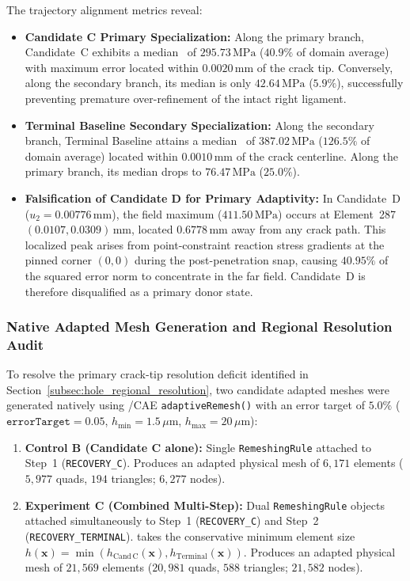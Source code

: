 The trajectory alignment metrics reveal:
\begin{itemize}
  \item \textbf{Candidate C Primary Specialization:} Along the primary branch, Candidate~C exhibits a median \MISESERI\ of $295.73\,\mathrm{MPa}$ ($40.9\%$ of domain average) with maximum error located within $0.0020\,\mathrm{mm}$ of the crack tip. Conversely, along the secondary branch, its median is only $42.64\,\mathrm{MPa}$ ($5.9\%$), successfully preventing premature over-refinement of the intact right ligament.
  \item \textbf{Terminal Baseline Secondary Specialization:} Along the secondary branch, Terminal Baseline attains a median \MISESERI\ of $387.02\,\mathrm{MPa}$ ($126.5\%$ of domain average) located within $0.0010\,\mathrm{mm}$ of the crack centerline. Along the primary branch, its median drops to $76.47\,\mathrm{MPa}$ ($25.0\%$).
  \item \textbf{Falsification of Candidate D for Primary Adaptivity:} In Candidate~D ($u_2 = 0.00776\,\mathrm{mm}$), the field maximum ($411.50\,\mathrm{MPa}$) occurs at Element~287 $(0.0107, 0.0309)\,\mathrm{mm}$, located $0.6778\,\mathrm{mm}$ away from any crack path. This localized peak arises from point-constraint reaction stress gradients at the pinned corner $(0, 0)$ during the post-penetration snap, causing $40.95\%$ of the squared error norm to concentrate in the far field. Candidate~D is therefore disqualified as a primary donor state.
\end{itemize}

\subsubsection{Native Adapted Mesh Generation and Regional Resolution Audit}
To resolve the primary crack-tip resolution deficit identified in Section~\ref{subsec:hole_regional_resolution}, two candidate adapted meshes were generated natively using \Abaqus/CAE \texttt{adaptiveRemesh()} with an error target of $5.0\%$ ($\mathtt{errorTarget = 0.05}$, $h_{\min} = 1.5\,\mu\mathrm{m}$, $h_{\max} = 20\,\mu\mathrm{m}$):
\begin{enumerate}
  \item \textbf{Control B (Candidate C alone):} Single \texttt{RemeshingRule} attached to Step~1 (\texttt{RECOVERY\_C}). Produces an adapted physical mesh of $6{,}171$ elements ($5{,}977$ quads, $194$ triangles; $6{,}277$ nodes).
  \item \textbf{Experiment C (Combined Multi-Step):} Dual \texttt{RemeshingRule} objects attached simultaneously to Step~1 (\texttt{RECOVERY\_C}) and Step~2 (\texttt{RECOVERY\_TERMINAL}). \Abaqus takes the conservative minimum element size $h(\mathbf{x}) = \min(h_{\mathrm{Cand\,C}}(\mathbf{x}), h_{\mathrm{Terminal}}(\mathbf{x}))$. Produces an adapted physical mesh of $21{,}569$ elements ($20{,}981$ quads, $588$ triangles; $21{,}582$ nodes).
\end{enumerate}

